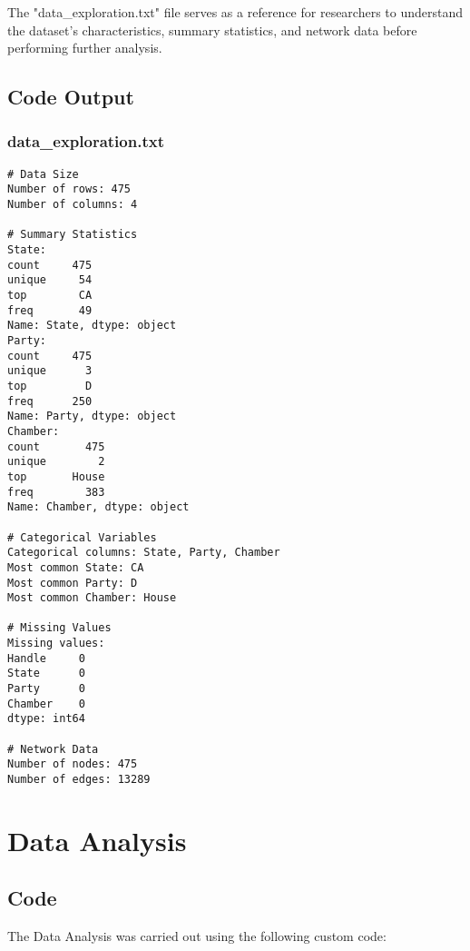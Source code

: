 \documentclass[11pt]{article}
\begin{document}
The "data\_exploration.txt" file serves as a reference for researchers to understand the dataset's characteristics, summary statistics, and network data before performing further analysis.

\subsection{Code Output}

\subsubsection*{data\_exploration.txt}

\begin{Verbatim}[tabsize=4]
# Data Size
Number of rows: 475
Number of columns: 4

# Summary Statistics
State:
count     475
unique     54
top        CA
freq       49
Name: State, dtype: object
Party:
count     475
unique      3
top         D
freq      250
Name: Party, dtype: object
Chamber:
count       475
unique        2
top       House
freq        383
Name: Chamber, dtype: object

# Categorical Variables
Categorical columns: State, Party, Chamber
Most common State: CA
Most common Party: D
Most common Chamber: House

# Missing Values
Missing values:
Handle     0
State      0
Party      0
Chamber    0
dtype: int64

# Network Data
Number of nodes: 475
Number of edges: 13289
\end{Verbatim}

\section{Data Analysis}
\subsection{{Code}}
The Data Analysis was carried out using the following custom code:
\end{document}
